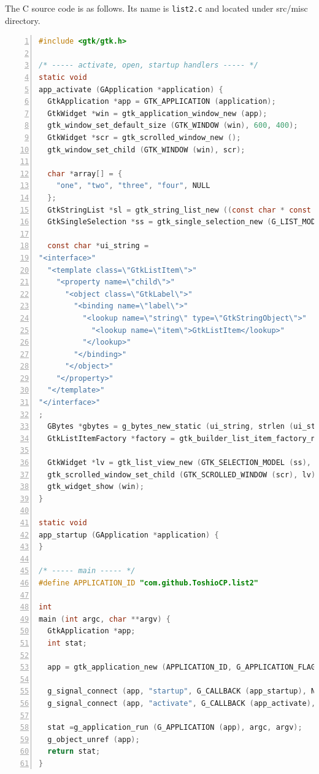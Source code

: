 The C source code is as follows. Its name is
\passthrough{\lstinline!list2.c!} and located under src/misc directory.

\begin{lstlisting}[language=C, numbers=left]
#include <gtk/gtk.h>

/* ----- activate, open, startup handlers ----- */
static void
app_activate (GApplication *application) {
  GtkApplication *app = GTK_APPLICATION (application);
  GtkWidget *win = gtk_application_window_new (app);
  gtk_window_set_default_size (GTK_WINDOW (win), 600, 400);
  GtkWidget *scr = gtk_scrolled_window_new ();
  gtk_window_set_child (GTK_WINDOW (win), scr);

  char *array[] = {
    "one", "two", "three", "four", NULL
  };
  GtkStringList *sl = gtk_string_list_new ((const char * const *) array);
  GtkSingleSelection *ss = gtk_single_selection_new (G_LIST_MODEL (sl));

  const char *ui_string =
"<interface>"
  "<template class=\"GtkListItem\">"
    "<property name=\"child\">"
      "<object class=\"GtkLabel\">"
        "<binding name=\"label\">"
          "<lookup name=\"string\" type=\"GtkStringObject\">"
            "<lookup name=\"item\">GtkListItem</lookup>"
          "</lookup>"
        "</binding>"
      "</object>"
    "</property>"
  "</template>"
"</interface>"
;
  GBytes *gbytes = g_bytes_new_static (ui_string, strlen (ui_string));
  GtkListItemFactory *factory = gtk_builder_list_item_factory_new_from_bytes (NULL, gbytes);

  GtkWidget *lv = gtk_list_view_new (GTK_SELECTION_MODEL (ss), factory);
  gtk_scrolled_window_set_child (GTK_SCROLLED_WINDOW (scr), lv);
  gtk_widget_show (win);
}

static void
app_startup (GApplication *application) {
}

/* ----- main ----- */
#define APPLICATION_ID "com.github.ToshioCP.list2"

int
main (int argc, char **argv) {
  GtkApplication *app;
  int stat;

  app = gtk_application_new (APPLICATION_ID, G_APPLICATION_FLAGS_NONE);

  g_signal_connect (app, "startup", G_CALLBACK (app_startup), NULL);
  g_signal_connect (app, "activate", G_CALLBACK (app_activate), NULL);

  stat =g_application_run (G_APPLICATION (app), argc, argv);
  g_object_unref (app);
  return stat;
}
\end{lstlisting}

